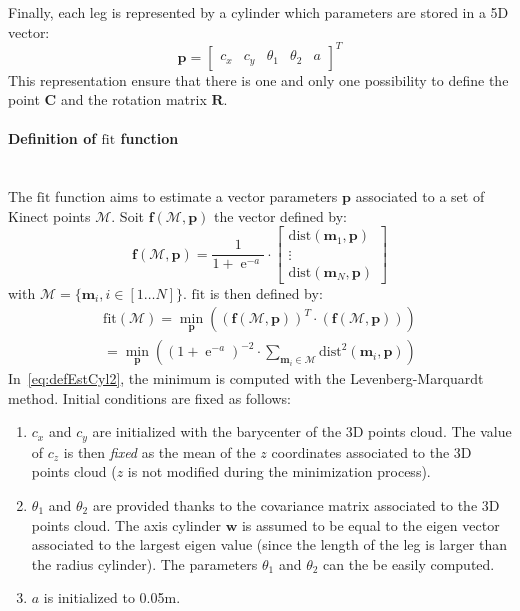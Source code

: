 \documentclass[letterpaper, 10 pt, conference]{ieeeconf}
\DeclareMathOperator{\e}{e}
\begin{document}
Finally, each leg is represented by a cylinder which parameters are stored in a 5D vector:
\begin{equation}
	\mathbf{p} = \begin{bmatrix}
		c_x & c_y & \theta_1 & \theta_2 & a
	\end{bmatrix}^T	
\end{equation}
This representation ensure that there is one and only one possibility to define the point $\mathbf{C}$ and the rotation matrix $\mathbf{R}$.


\paragraph{Definition of $\mathrm{fit}$ function}~\\
The $\mathrm{fit}$ function aims to estimate a vector parameters $\mathbf{p}$ associated to a set of Kinect points $\mathcal{M}$. Soit $\mathbf{f}(\mathcal{M},\mathbf{p})$ the vector defined by:
\begin{equation}
	\mathbf{f}(\mathcal{M},\mathbf{p}) = \frac{1}{1+\e^{-a}}\cdot
	\begin{bmatrix}
		\mathrm{dist}(\mathbf{m}_1,\mathbf{p}) \\
		\vdots \\
		\mathrm{dist}(\mathbf{m}_N,\mathbf{p})
	\end{bmatrix}
	\label{eq:defEstCyl1}
\end{equation}
with $\mathcal{M} = \{\mathbf{m}_i,i\in[1\dots N]\}$.
$\mathrm{fit}$ is then defined by:
\begin{multline}
	\mathrm{fit}(\mathcal{M}) = 
	\min_{\mathbf{p}}
	\left(
		\left(\mathbf{f}(\mathcal{M},\mathbf{p})\right)^T\cdot
		\left(\mathbf{f}(\mathcal{M},\mathbf{p})\right)
	\right) \\=
	\min_{\mathbf{p}}
	\left(
		\left(1+\e^{-a}\right)^{-2}\cdot\sum_{\mathbf{m}_i\in\mathcal{M}} \mathrm{dist}^2(\mathbf{m}_i,\mathbf{p})
	\right)
	\label{eq:defEstCyl2}
\end{multline}
In~\eqref{eq:defEstCyl2}, the minimum is computed with the Levenberg-Marquardt method. Initial conditions are fixed as follows:
\begin{enumerate}
	\item $c_x$ and $c_y$ are initialized with the barycenter of the 3D points cloud. The value of $c_z$ is then \emph{fixed} as the mean of the $z$ coordinates associated to the 3D points cloud ($z$ is not modified during the minimization process).
	\item $\theta_1$ and $\theta_2$ are provided thanks to the covariance matrix associated to the 3D points cloud. The axis cylinder $\mathbf{w}$ is assumed to be equal to the eigen vector associated to the largest eigen value (since the length of the leg is larger than the radius cylinder). The parameters $\theta_1$ and $\theta_2$ can the be easily computed.
	\item $a$ is initialized to 0.05m.
\end{enumerate}
\end{document}
